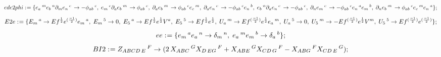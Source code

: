 \documentclass[11pt]{article}
\def\specialcolon{\mathrel{\mathop{:}}\hspace{-.5em}}
\begin{document}
\begin{dmath*}[compact, spread=2pt]
ede2phi\specialcolon{}= \{{e}_{a}\,^{m} {e}_{b}\,^{n} {\partial}_{m}{{e}_{n}\,^{c}}\,  \rightarrow -{\phi}_{a b}\,^{c},\; {e}_{m}\,^{c} {\partial}_{a}{{e}_{b}\,^{m}}\,  \rightarrow {\phi}_{a b}\,^{c},\; {\partial}_{a}{{e}_{b}\,^{m}}\,  \rightarrow {\phi}_{a b}\,^{c} {e}_{c}\,^{m},\; {\partial}_{a}{{e}_{n}\,^{c}}\,  \rightarrow -{\phi}_{a b}\,^{c} {e}_{n}\,^{b},\; {e}_{b}\,^{n} {\partial}_{a}{{e}_{n}\,^{c}}\,  \rightarrow -{\phi}_{a b}\,^{c},\; {\partial}_{n}{{e}_{m}\,^{c}}\,  \rightarrow -{\phi}_{a b}\,^{c} {e}_{n}\,^{a} {e}_{m}\,^{b},\; {\partial}_{n}{{e}_{b}\,^{m}}\,  \rightarrow {\phi}_{a b}\,^{c} {e}_{c}\,^{m} {e}_{n}\,^{a}\};
\end{dmath*}
\begin{dmath*}[compact, spread=2pt]
E2e\specialcolon{}= \{{E}_{m}\,^{a} \rightarrow Ef{}^{\frac{1}{2}} e{}^{(\frac{-1}{2})} {e}_{m}\,^{a},\; {E}_{m}\,^{5} \rightarrow 0,\; {E}_{5}\,^{a} \rightarrow Ef{}^{\frac{1}{2}} e{}^{\frac{1}{2}} {V}^{a},\; {E}_{5}\,^{5} \rightarrow Ef{}^{\frac{1}{2}} e{}^{\frac{1}{2}},\; {U}_{a}\,^{m} \rightarrow Ef{}^{(\frac{-1}{2})} e{}^{\frac{1}{2}} {e}_{a}\,^{m},\; {U}_{a}\,^{5} \rightarrow 0,\; {U}_{5}\,^{m} \rightarrow -Ef{}^{(\frac{-1}{2})} e{}^{\frac{1}{2}} {V}^{m},\; {U}_{5}\,^{5} \rightarrow Ef{}^{(\frac{-1}{2})} e{}^{(\frac{-1}{2})}\};
\end{dmath*}
\begin{dmath*}[compact, spread=2pt]
ee\specialcolon{}= \{{e}_{m}\,^{a} {e}_{a}\,^{n} \rightarrow {\delta}_{m}\,^{n},\; {e}_{a}\,^{m} {e}_{m}\,^{b} \rightarrow {\delta}_{a}\,^{b}\};
\end{dmath*}
\begin{dmath*}[compact, spread=2pt]
BI2\specialcolon{}= {Z}_{A B C D\,  E}\,^{F} \rightarrow (2\, {X}_{A B C}\,^{G} {X}_{D\,  E G}\,^{F} + {X}_{A B E}\,^{G} {X}_{C D\,  G}\,^{F} - {X}_{A B G}\,^{F} {X}_{C D\,  E}\,^{G});
\end{dmath*}
\end{document}
